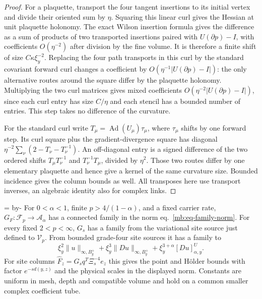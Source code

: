 \documentclass[11pt,letterpaper,reqno]{amsart}
\makeatletter
\numberwithin{equation}{section}
\renewcommand{\eqref}[1]{\textup{eq.~\ref{#1}}}
\newcommand{\mbneedspace}[1]{\par\begingroup
  \dimen0=\pagegoal\advance\dimen0 by-\pagetotal
  \ifdim\dimen0<#1\relax\newpage\fi\endgroup}
\theoremstyle{definition}
\newcommand{\ms@minorstart}{%
  \pushQED{\qed}\renewcommand{\qedsymbol}{$\blacksquare$}}
\newenvironment{lemma}[1][]{\ms@minorstart\ms@lemma[#1]}
  {\popQED\endms@lemma}
\theoremstyle{remark}
\makeatother
\begin{document}
\begin{proof}
For a plaquette, transport the four tangent insertions to its initial vertex and divide their oriented sum by \(\eta\). Squaring this linear curl gives the Hessian at unit plaquette holonomy. The exact Wilson insertion formula gives the difference as a sum of products of two transported insertions paired with \(U(\partial p)-I\), with coefficients \(O(\eta^{-2})\) after division by the fine volume. It is therefore a finite shift of size \(C\kappa\xi_y^{-2}\). Replacing the four path transports in this curl by the standard covariant forward curl changes a coefficient by \(O(\eta^{-1}|U(\partial p)-I|)\): the only alternative routes around the square differ by the plaquette holonomy. Multiplying the two curl matrices gives mixed coefficients \(O(\eta^{-2}|U(\partial p)-I|)\), since each curl entry has size \(C/\eta\) and each stencil has a bounded number of entries. This step takes no difference of the curvature.

For the standard curl write \(T_\mu=\operatorname{Ad}(U_\mu)\tau_\mu\), where \(\tau_\mu\) shifts by one forward step. Its curl square plus the gradient-divergence square has diagonal \(\eta^{-2}\sum_\nu(2-T_\nu-T_\nu^{-1})\). An off-diagonal entry is a signed difference of the two ordered shifts \(T_\mu T_\nu^{-1}\) and \(T_\nu^{-1}T_\mu\), divided by \(\eta^2\). Those two routes differ by one elementary plaquette and hence give a kernel of the same curvature size. Bounded incidence gives the column bounds as well. All transposes here use transport inverses, an algebraic identity also for complex links.
\end{proof}

\mbneedspace{16\baselineskip}
\begin{lemma}[Strong columns of the positive primitives]
\label{mb:lem-strong-positive-columns}
For \(0<\alpha<1\), finite \(p>4/(1-\alpha)\), and a fixed carrier rate, \(G_F:\mathcal F_p\to\mathcal A_\alpha\) has a connected family in the norm \eqref{mb:eq-family-norm}. For every fixed \(2<p<\infty\), \(G_s\) has a family from the variational site source just defined to \(\mathcal V_p\). From bounded grade-four site sources it has a family to
\[
       \xi_y^2\|u\|_{\infty,B_y^+}
       +\xi_y^3\|Du\|_{\infty,B_y^+}
       +\xi_y^{3+\alpha}[Du]_{\alpha,y}^U .
\]
For site columns \(\widehat F_z=G_sq^T\Xi_s^{-4}e_z\) this gives the point and H\"older bounds with factor \(e^{-s d(y,z)}\) and the physical scales in the displayed norm. Constants are uniform in mesh, depth and compatible volume and hold on a common smaller complex coefficient tube.
\end{lemma}
\end{document}
